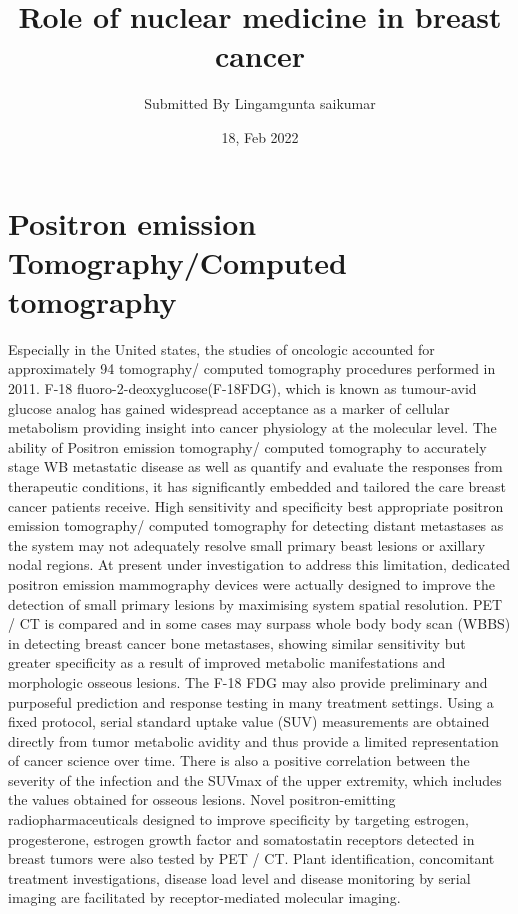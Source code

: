 \documentclass{article}
\title{Role of nuclear medicine in breast cancer}
\author{Submitted By Lingamgunta saikumar}
\date{18, Feb 2022}
\begin{document}
\maketitle

\section{Positron emission Tomography/Computed tomography}
Especially in the United states, the studies of oncologic accounted for 
approximately 94%
tomography/ computed tomography procedures performed in 2011. F-18 
fluoro-2-deoxyglucose(F-18FDG), which is known as tumour-avid glucose 
analog has gained widespread acceptance as a marker of cellular metabolism 
providing insight into cancer physiology at the molecular level. The ability of 
Positron emission tomography/ computed tomography to accurately stage WB 
metastatic disease as well as quantify and evaluate the responses from 
therapeutic conditions, it has significantly embedded and tailored the care 
breast cancer patients receive. High sensitivity and specificity best appropriate 
positron emission tomography/ computed tomography for detecting distant 
metastases as the system may not adequately resolve small primary beast 
lesions or axillary nodal regions. At present under investigation to address this 
limitation, dedicated positron emission mammography devices were actually 
designed to improve the detection of small primary lesions by maximising 
system spatial resolution. PET / CT is compared and in some cases may surpass 
whole body body scan (WBBS) in detecting breast cancer bone metastases, 
showing similar sensitivity but greater specificity as a result of improved 
metabolic manifestations and morphologic osseous lesions. The F-18 FDG may 
also provide preliminary and purposeful prediction and response testing in 
many treatment settings. Using a fixed protocol, serial standard uptake value 
(SUV) measurements are obtained directly from tumor metabolic avidity and 
thus provide a limited representation of cancer science over time. There is also 
a positive correlation between the severity of the infection and the SUVmax of 
the upper extremity, which includes the values obtained for osseous lesions. 
Novel positron-emitting radiopharmaceuticals designed to improve specificity 
by targeting estrogen, progesterone, estrogen growth factor and somatostatin 
receptors detected in breast tumors were also tested by PET / CT. Plant 
identification, concomitant treatment investigations, disease load level and 
disease monitoring by serial imaging are facilitated by receptor-mediated 
molecular imaging.
\end{document}
